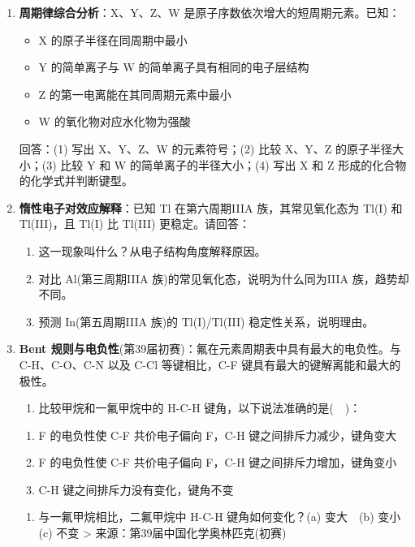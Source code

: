 \begin{enumerate}
  请推断 A、B、C、D 的元素符号，并说明推理过程。
\item
  \textbf{周期律综合分析}：X、Y、Z、W 是原子序数依次增大的短周期元素。已知：

  \begin{itemize}
  \tightlist
  \item
    X 的原子半径在同周期中最小
  \item
    Y 的简单离子与 W 的简单离子具有相同的电子层结构
  \item
    Z 的第一电离能在其同周期元素中最小
  \item
    W 的氧化物对应水化物为强酸
  \end{itemize}

  回答：(1) 写出 X、Y、Z、W 的元素符号；(2) 比较 X、Y、Z 的原子半径大小；(3) 比较 Y 和 W 的简单离子的半径大小；(4) 写出 X 和 Z 形成的化合物的化学式并判断键型。
\item
  \textbf{惰性电子对效应解释}：已知 Tl 在第六周期IIIA 族，其常见氧化态为 Tl(I) 和 Tl(III)，且 Tl(I) 比 Tl(III) 更稳定。请回答：

  \begin{enumerate}
  \def\labelenumii{(\arabic{enumii})}
  \tightlist
  \item
    这一现象叫什么？从电子结构角度解释原因。
  \item
    对比 Al(第三周期IIIA 族)的常见氧化态，说明为什么同为IIIA 族，趋势却不同。
  \item
    预测 In(第五周期IIIA 族)的 Tl(I)/Tl(III) 稳定性关系，说明理由。
  \end{enumerate}
\item
  \textbf{Bent 规则与电负性}(第39届初赛)：氟在元素周期表中具有最大的电负性。与 C-H、C-O、C-N 以及 C-Cl 等键相比，C-F 键具有最大的键解离能和最大的极性。

  \begin{enumerate}
  \def\labelenumii{(\arabic{enumii})}
  \tightlist
  \item
    比较甲烷和一氟甲烷中的 H-C-H 键角，以下说法准确的是(　)：
  \end{enumerate}

  \begin{enumerate}
  \def\labelenumii{(\alph{enumii})}
  \tightlist
  \item
    F 的电负性使 C-F 共价电子偏向 F，C-H 键之间排斥力减少，键角变大
  \item
    F 的电负性使 C-F 共价电子偏向 F，C-H 键之间排斥力增加，键角变小
  \item
    C-H 键之间排斥力没有变化，键角不变
  \end{enumerate}

  \begin{enumerate}
  \def\labelenumii{(\arabic{enumii})}
  \setcounter{enumii}{1}
  \tightlist
  \item
    与一氟甲烷相比，二氟甲烷中 H-C-H 键角如何变化？(a) 变大　(b) 变小　(c) 不变
    \textgreater{} 来源：第39届中国化学奥林匹克(初赛)
  \end{enumerate}
\end{enumerate}

